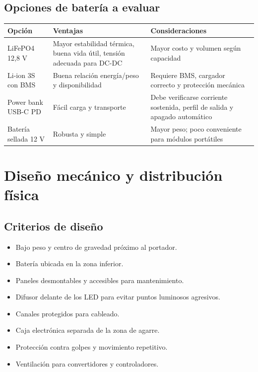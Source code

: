 \documentclass[11pt,a4paper]{article}
\begin{document}
\subsection{Opciones de batería a evaluar}
\begin{table}[H]
\centering
\begin{tabularx}{\textwidth}{@{}P{3.1cm}Y Y@{}}
\toprule
\textbf{Opción} & \textbf{Ventajas} & \textbf{Consideraciones}\\
\midrule
LiFePO4 12,8 V & Mayor estabilidad térmica, buena vida útil, tensión adecuada para DC-DC & Mayor costo y volumen según capacidad\\
Li-ion 3S con BMS & Buena relación energía/peso y disponibilidad & Requiere BMS, cargador correcto y protección mecánica\\
Power bank USB-C PD & Fácil carga y transporte & Debe verificarse corriente sostenida, perfil de salida y apagado automático\\
Batería sellada 12 V & Robusta y simple & Mayor peso; poco conveniente para módulos portátiles\\
\bottomrule
\end{tabularx}
\end{table}

\section{Diseño mecánico y distribución física}
\subsection{Criterios de diseño}
\begin{itemize}
  \item Bajo peso y centro de gravedad próximo al portador.
  \item Batería ubicada en la zona inferior.
  \item Paneles desmontables y accesibles para mantenimiento.
  \item Difusor delante de los LED para evitar puntos luminosos agresivos.
  \item Canales protegidos para cableado.
  \item Caja electrónica separada de la zona de agarre.
  \item Protección contra golpes y movimiento repetitivo.
  \item Ventilación para convertidores y controladores.
\end{itemize}
\end{document}
